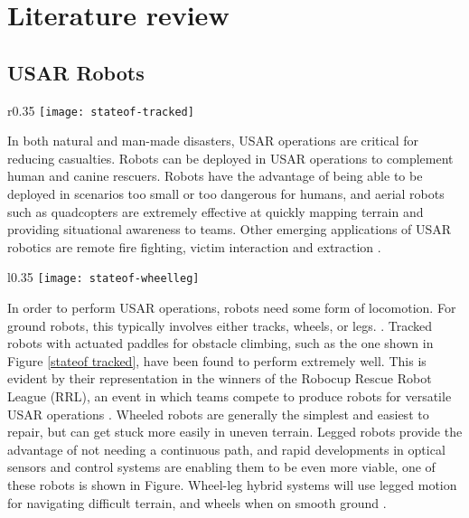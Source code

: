  \chapter{Literature review}

\section{USAR Robots}

\begin{wrapfigure}{r}{0.35\textwidth} %
	\centering
	\texttt{[image: stateof-tracked]}
	\caption{A tracked USAR robot, with paddles for obstacle climbing \citep{stateof}}
	\label{stateof tracked}
\end{wrapfigure}

In both natural and man-made disasters, USAR operations are critical for reducing casualties. Robots can be deployed in USAR operations to complement human and canine rescuers. Robots have the advantage of being able to be deployed in scenarios too small or too dangerous for humans, and aerial robots such as quadcopters are extremely effective at quickly mapping terrain and providing situational awareness to teams. Other emerging applications of USAR robotics are remote fire fighting, victim interaction and extraction \citep{stateof}.\\

\begin{wrapfigure}{l}{0.35\textwidth} %
	\centering
	\texttt{[image: stateof-wheelleg]}
	\caption{ANYmal, a legged USAR robot \citep{stateof}}
	\label{stateof wheelleg}
\end{wrapfigure}

In order to perform USAR operations, robots need some form of locomotion. For ground robots, this typically involves either tracks, wheels, or legs. \citep{stateof}. Tracked robots with actuated paddles for obstacle climbing, such as the one shown in Figure \ref{stateof tracked}, have been found to perform extremely well. This is evident by their representation in the winners of the Robocup Rescue Robot League (RRL), an event in which teams compete to produce robots for versatile USAR operations \citep{Sheh-2016}. Wheeled robots are generally the simplest and easiest to repair, but can get stuck more easily in uneven terrain. Legged robots provide the advantage of not needing a continuous path, and rapid developments in optical sensors and control systems are enabling them to be even more viable, one of these robots is shown in Figure. Wheel-leg hybrid systems will use legged motion for navigating difficult terrain, and wheels when on smooth ground \citep{stateof}. 

